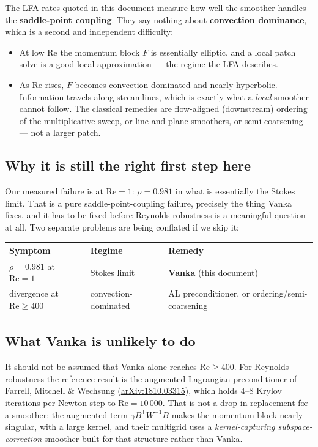 \documentclass[11pt,a4paper]{article}
\newcommand{\Rey}{\mathrm{Re}}
\begin{document}
\begin{tcolorbox}[colback=orange!6,colframe=orange!60!black,title=\bfseries What the 0.08 does and does not mean]
The LFA rates quoted in this document measure how well the smoother handles the
\textbf{saddle-point coupling}. They say nothing about \textbf{convection dominance}, which is
a second and independent difficulty:
\begin{itemize}[leftmargin=*,topsep=2pt]
\item At low $\Rey$ the momentum block $F$ is essentially elliptic, and a local patch solve is
a good local approximation --- the regime the LFA describes.
\item As $\Rey$ rises, $F$ becomes convection-dominated and nearly hyperbolic. Information
travels along streamlines, which is exactly what a \emph{local} smoother cannot follow. The
classical remedies are flow-aligned (downstream) ordering of the multiplicative sweep, or line
and plane smoothers, or semi-coarsening --- not a larger patch.
\end{itemize}
\end{tcolorbox}

\subsection{Why it is still the right first step here}
Our measured failure is at $\Rey = 1$: $\rho = 0.981$ in what is essentially the Stokes limit.
That is a pure saddle-point-coupling failure, precisely the thing Vanka fixes, and it has to be
fixed before Reynolds robustness is a meaningful question at all. Two separate problems are
being conflated if we skip it:
\begin{center}
\begin{tabular}{@{}lll@{}}
\toprule
Symptom & Regime & Remedy \\
\midrule
$\rho = 0.981$ at $\Rey=1$ & Stokes limit & \textbf{Vanka} (this document) \\
divergence at $\Rey \ge 400$ & convection-dominated & AL preconditioner, or ordering/semi-coarsening \\
\bottomrule
\end{tabular}
\end{center}

\subsection{What Vanka is unlikely to do}
It should not be assumed that Vanka alone reaches $\Rey \ge 400$. For Reynolds robustness the
reference result is the augmented-Lagrangian preconditioner of Farrell, Mitchell \& Wechsung
(\href{https://arxiv.org/pdf/1810.03315}{arXiv:1810.03315}), which holds 4--8 Krylov iterations
per Newton step to $\Rey = 10\,000$. That is not a drop-in replacement for a smoother: the
augmented term $\gamma B^{\mathsf T}W^{-1}B$ makes the momentum block nearly singular, with a
large kernel, and their multigrid uses a \emph{kernel-capturing subspace-correction} smoother
built for that structure rather than Vanka.
\end{document}
